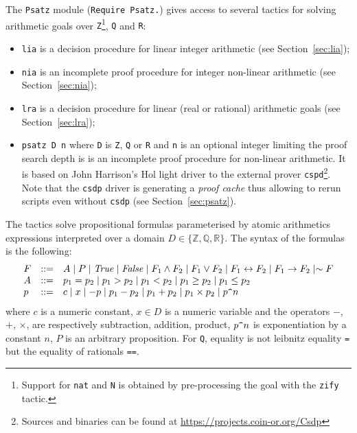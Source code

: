 \newtheorem{theorem}{Theorem}

 
   
\label{sec:psatz-hurry}
The {\tt Psatz} module ({\tt Require Psatz.}) gives access to several tactics for solving arithmetic goals over
 {\tt Z}\footnote{Support for {\tt nat} and {\tt N} is obtained by pre-processing the goal with the {\tt zify} tactic.}, {\tt Q} and {\tt R}:
\begin{itemize}
\item {\tt lia} is a decision procedure for linear integer arithmetic (see Section~\ref{sec:lia});
\item {\tt nia} is an incomplete proof procedure for integer non-linear arithmetic (see Section~\ref{sec:nia});
\item {\tt lra} is a decision procedure for linear (real or rational) arithmetic goals (see Section~\ref{sec:lra});
\item {\tt psatz D n} where {\tt D} is {\tt Z}, {\tt Q} or {\tt R} and {\tt n} is an optional integer limiting the proof search depth is
is an incomplete proof procedure for non-linear arithmetic. It is based on John Harrison's Hol light driver to the external prover {\tt cspd}\footnote{Sources and binaries can be found at \url{https://projects.coin-or.org/Csdp}}. 
   Note that the {\tt csdp} driver is generating 
   a \emph{proof cache} thus allowing to rerun scripts even without {\tt csdp} (see Section~\ref{sec:psatz}). 
\end{itemize}

The tactics solve propositional formulas parameterised by atomic arithmetics expressions
interpreted over a domain $D \in \{\mathbb{Z}, \mathbb{Q}, \mathbb{R} \}$.
The syntax of the formulas is the following:
\[
\begin{array}{lcl}
 F &::=&  A \mid P \mid \mathit{True} \mid \mathit{False} \mid F_1 \land F_2 \mid F_1 \lor F_2 \mid F_1 \leftrightarrow F_2 \mid F_1 \to F_2 \mid \sim F\\
 A &::=& p_1 = p_2 \mid  p_1 > p_2 \mid p_1 < p_2 \mid p_1 \ge p_2 \mid p_1 \le p_2 \\
 p &::=& c \mid x \mid {-}p \mid p_1 - p_2 \mid p_1 + p_2 \mid p_1 \times p_2 \mid p \verb!^! n
 \end{array}
 \]
 where $c$ is a numeric constant, $x\in D$ is a numeric variable and the operators $-$, $+$, $\times$, are
 respectively subtraction, addition, product, $p \verb!^!n $ is exponentiation by a constant $n$, $P$ is an
 arbitrary proposition.
 For {\tt Q}, equality is not leibnitz equality {\tt =} but the equality of rationals {\tt ==}.

